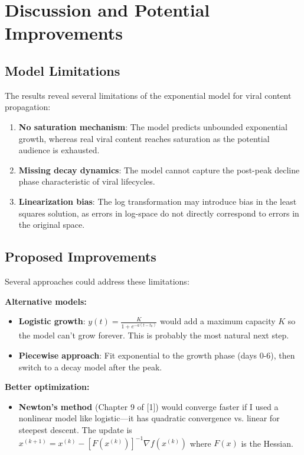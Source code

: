 \documentclass[11pt]{article}
\begin{document}
\section{Discussion and Potential Improvements}

\subsection{Model Limitations}

The results reveal several limitations of the exponential model for viral content propagation:

\begin{enumerate}
    \item \textbf{No saturation mechanism}: The model predicts unbounded exponential growth, whereas real viral content reaches saturation as the potential audience is exhausted.
    
    \item \textbf{Missing decay dynamics}: The model cannot capture the post-peak decline phase characteristic of viral lifecycles.
    
    \item \textbf{Linearization bias}: The log transformation may introduce bias in the least squares solution, as errors in log-space do not directly correspond to errors in the original space.
\end{enumerate}

\subsection{Proposed Improvements}

Several approaches could address these limitations:

\textbf{Alternative models:}
\begin{itemize}
    \item \textbf{Logistic growth}: $y(t) = \frac{K}{1 + e^{-a(t-t_0)}}$ would add a maximum capacity $K$ so the model can't grow forever. This is probably the most natural next step.
    \item \textbf{Piecewise approach}: Fit exponential to the growth phase (days 0-6), then switch to a decay model after the peak.
\end{itemize}

\textbf{Better optimization:}
\begin{itemize}
    \item \textbf{Newton's method} (Chapter 9 of [1]) would converge faster if I used a nonlinear model like logistic---it has quadratic convergence vs. linear for steepest descent. The update is $x^{(k+1)} = x^{(k)} - [F(x^{(k)})]^{-1}\nabla f(x^{(k)})$ where $F(x)$ is the Hessian.
\end{itemize}
\end{document}
